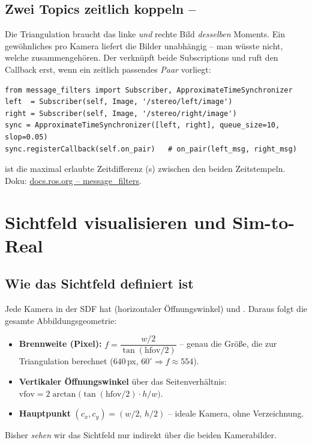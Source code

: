 \subsection{Zwei Topics zeitlich koppeln -- }
Die Triangulation braucht das linke \emph{und} rechte Bild \emph{desselben}
Moments. Ein gewöhnliches  pro Kamera liefert die
Bilder unabhängig -- man wüsste nicht, welche zusammengehören. Der
 verknüpft beide Subscriptions und ruft den
Callback erst, wenn ein zeitlich passendes \emph{Paar} vorliegt:
\begin{lstlisting}[style=py]
from message_filters import Subscriber, ApproximateTimeSynchronizer
left  = Subscriber(self, Image, '/stereo/left/image')
right = Subscriber(self, Image, '/stereo/right/image')
sync = ApproximateTimeSynchronizer([left, right], queue_size=10, slop=0.05)
sync.registerCallback(self.on_pair)   # on_pair(left_msg, right_msg)
\end{lstlisting}
\noindent {} ist die maximal erlaubte Zeitdifferenz (s) zwischen den
beiden Zeitstempeln. Doku:
\href{https://docs.ros.org/en/jazzy/p/message_filters/}{docs.ros.org -- message\_filters}.

\section{Sichtfeld visualisieren und Sim-to-Real}

\subsection{Wie das Sichtfeld definiert ist}
Jede Kamera in der SDF hat  (horizontaler Öffnungswinkel)
und . Daraus folgt die gesamte Abbildungsgeometrie:
\begin{itemize}
\item \textbf{Brennweite (Pixel):} $f=\dfrac{w/2}{\tan(\text{hfov}/2)}$ -- genau die
  Größe, die  zur Triangulation berechnet
  ($640\,$px, $60^\circ \Rightarrow f\approx 554$).
\item \textbf{Vertikaler Öffnungswinkel} über das Seitenverhältnis:
  $\text{vfov}=2\arctan\!\big(\tan(\text{hfov}/2)\cdot h/w\big)$.
\item \textbf{Hauptpunkt} $(c_x,c_y)=(w/2,\,h/2)$ -- ideale Kamera, ohne Verzeichnung.
\end{itemize}
Bisher \emph{sehen} wir das Sichtfeld nur indirekt über die beiden Kamerabilder.

